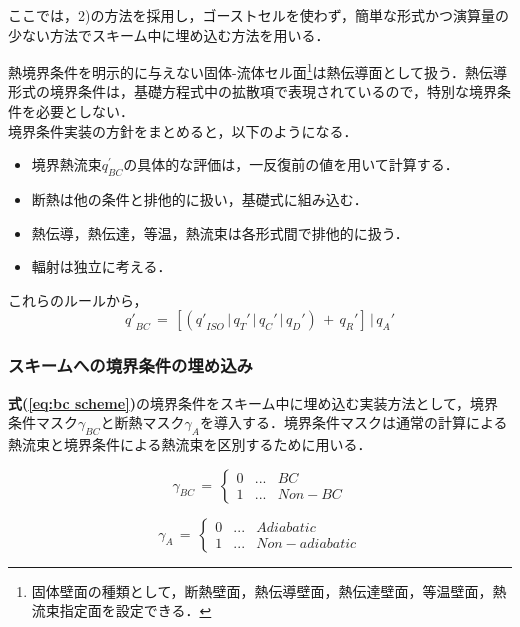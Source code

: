 \noindent ここでは，2)の方法を採用し，ゴーストセルを使わず，簡単な形式かつ演算量の少ない方法でスキーム中に埋め込む方法を用いる．

熱境界条件を明示的に与えない固体-流体セル面\footnote{固体壁面の種類として，断熱壁面，熱伝導壁面，熱伝達壁面，等温壁面，熱流束指定面を設定できる．}は熱伝導面として扱う．熱伝導形式の境界条件は，基礎方程式中の拡散項で表現されているので，特別な境界条件を必要としない．\\

境界条件実装の方針をまとめると，以下のようになる．
\begin{itemize}
\item 境界熱流束$q_{BC}^{\prime}$の具体的な評価は，一反復前の値を用いて計算する．
\item 断熱は他の条件と排他的に扱い，基礎式に組み込む．
\item 熱伝導，熱伝達，等温，熱流束は各形式間で排他的に扱う．
\item 輻射は独立に考える．
\end{itemize}

これらのルールから，
\begin{equation}
{{q}'}_{BC}\,=\,
{\left[{\left({{{{q}'}_{ISO}}\,\vert\,
{{{q_T}'}\,\vert\,{{{q_C}'}}\,\vert\,{{q_D}'}}}\right)\,+\,{{q_R}'}}\right]}\,\vert\,{{{q_A}'}}
\label{eq:bc scheme}
\end{equation}

%
\subsubsection{スキームへの境界条件の埋め込み}
\label{sec:embbeded scheme}
\textbf{式(\ref{eq:bc scheme})}の境界条件をスキーム中に埋め込む実装方法として，境界条件マスク$\gamma_{BC}$と断熱マスク$\gamma_A$を導入する．境界条件マスクは通常の計算による熱流束と境界条件による熱流束を区別するために用いる．

\begin{equation}
\mathit{\gamma_{BC}}\,=\,\left\{
\begin{array}{lll}
0 & \mathrm{...} & BC\\
1 & \mathrm{...} & Non-BC
\end{array}
\right.
\label{eq:gamma BC definition}
\end{equation}

\begin{equation}
\mathit{\gamma_{A}}\,=\,\left\{
\begin{array}{lll}
0 & \mathrm{...} & Adiabatic\\
1 & \mathrm{...} & Non-adiabatic
\end{array}
\right.
\label{eq:gamma A definition}
\end{equation}

